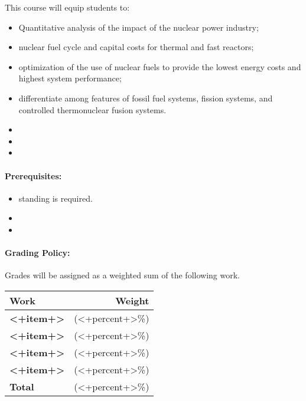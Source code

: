 \documentclass[11pt, a4paper]{article}
\begin{document}
This course will equip students to:

\begin{itemize}
\item Quantitative analysis of the impact of the nuclear power industry; 
\item nuclear fuel cycle and capital costs for thermal and fast reactors; 
\item optimization of the use of nuclear fuels to provide the lowest energy costs and highest system performance; 
\item differentiate among features of fossil fuel systems, fission systems, and controlled thermonuclear fusion systems.
\item <+objective+>
\item <+objective+>
\item <+objective+>
\end{itemize}

\paragraph{Prerequisites:} 
\begin{itemize}
\item <+standing+> standing is required.
\item <+required courses+>
\item <+other+>
\end{itemize}

\paragraph{Grading Policy:} Grades will be assigned as a weighted sum of the following work. 

\begin{table}[h]
\begin{tabularx}{\textwidth}{Xr}
\textbf{Work} & \textbf{Weight}\\
\hline
\textbf{<+item+>} & (<+percent+>\%) \\
\textbf{<+item+>} & (<+percent+>\%) \\
\textbf{<+item+>} & (<+percent+>\%) \\
\textbf{<+item+>} & (<+percent+>\%) \\
\hline
\textbf{Total} & (<+percent+>\%) \\
\end{tabularx}
\end{table}
\end{document}
